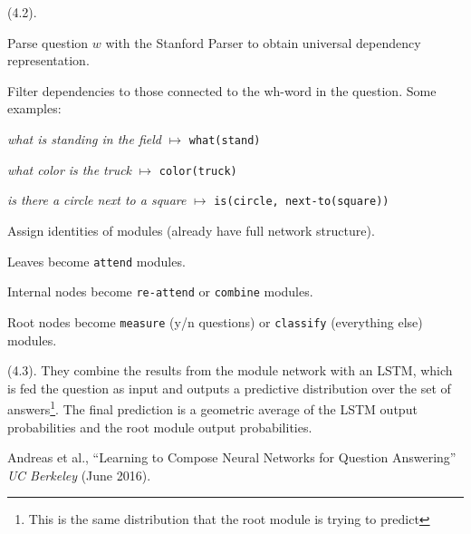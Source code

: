 \documentclass[11pt]{article}
\begin{document}
 (4.2).
\begin{compactenum}
	\item Parse question $w$ with the Stanford Parser to obtain universal dependency representation.
	
	\item Filter dependencies to those connected to the wh-word in the question. Some examples:
	\begin{compactitem}
		\item \textit{what is standing in the field} $\mapsto$ \texttt{what(stand)}
		\item \textit{what color is the truck} $\mapsto$ \texttt{color(truck)}
		\item \textit{is there a circle next to a square} $\mapsto$ \texttt{is(circle, next-to(square))}
	\end{compactitem} 
	
	\item Assign identities of modules (already have full network structure). 
	\begin{compactitem}
		\item Leaves become \texttt{attend} modules.
		\item Internal nodes become \texttt{re-attend} or \texttt{combine} modules.
		\item Root nodes become \texttt{measure} (y/n questions) or \texttt{classify} (everything else) modules.
	\end{compactitem}
\end{compactenum}

 (4.3). They combine the results from the module network with an LSTM, which is fed the question as input and outputs a predictive distribution over the set of answers\footnote{This is the same distribution that the root module is trying to predict}. The final prediction is a geometric average of the LSTM output probabilities and the root module output probabilities. 




\vspace{-1em}
{\footnotesize Andreas et al., ``Learning to Compose Neural Networks for Question Answering'' \textit{UC Berkeley} (June 2016).}
\end{document}
